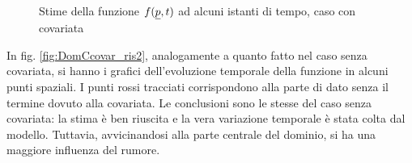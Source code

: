 \documentclass[a4paper,11pt,twoside,openright]{book}							%
\begin{document}
\begin{figure}[H]
{   }
\caption{Stime della funzione $f(\protect\underline{p},t)$ ad alcuni istanti di tempo, caso con covariata}
\label{fig:DomCcovar_ris}
\end{figure}

In fig. \ref{fig:DomCcovar_ris2}, analogamente a quanto fatto nel caso senza covariata, si hanno i grafici dell'evoluzione temporale della funzione in alcuni punti spaziali. I punti rossi tracciati corrispondono alla parte di dato senza il termine dovuto alla covariata. Le conclusioni sono le stesse del caso senza covariata: la stima è ben riuscita e la vera variazione temporale è stata colta dal modello. Tuttavia, avvicinandosi alla parte centrale del dominio, si ha una maggiore influenza del rumore.
\end{document}
